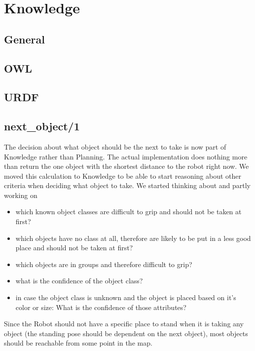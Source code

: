 \documentclass[main.tex]{subfiles}
\begin{document}
	
	\chapter{Knowledge}
		\section{General}
				


		\section{OWL}


		\section{URDF}


		\section{next\_object/1}
		The decision about what object should be the next to take is now part of Knowledge rather than Planning. The actual implementation does nothing more than return the one object with the shortest distance to the robot right now. We moved this calculation to Knowledge to be able to start reasoning about other criteria when deciding what object to take. We started thinking about and partly working on
\begin{itemize}
\item which known object classes are difficult to grip and should not be taken at first?
\item which objects have no class at all, therefore are likely to be put in a less good place and should not be taken at first?
\item which objects are in groups and therefore difficult to grip?
\item what is the confidence of the object class?
\item in case the object class is unknown and the object is placed based on it's color or size: What is the confidence of those attributes?
\end{itemize}

Since the Robot should not have a specific place to stand when it is taking any object (the standing pose should be dependent on the next object), most objects should be reachable from some point in the map.
\end{document}

